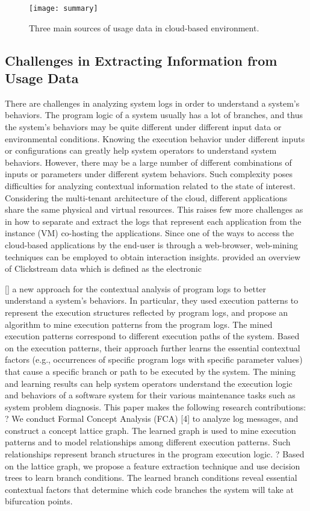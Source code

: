 \begin{figure}[t!]
	\centering
	\texttt{[image: summary]}
	\caption{Three main sources of usage data in cloud-based environment.}
	\label{fig:schema}
\end{figure}

\subsection{Challenges in Extracting Information from Usage Data}

There are challenges in analyzing system logs in order to understand a system’s behaviors. The program logic of a system usually has a lot of branches, and thus the system’s behaviors may be quite different under different input data or environmental conditions. Knowing the execution behavior under different inputs or configurations can greatly help system operators to understand system behaviors. However, there may be a large number of different combinations of inputs or parameters under different system behaviors. Such complexity poses difficulties for analyzing contextual information related to the state of interest. Considering the multi-tenant architecture of the cloud, different applications share the same physical and virtual resources. This raises few more challenges as in how to separate and extract the logs that represent each application from the instance (VM) co-hosting the applications. 
%
Since one of the ways to access the cloud-based applications by the end-user is through a web-browser, web-mining techniques can be employed to obtain interaction insights. \cite{Bucklin2009} provided an overview of Clickstream data which is defined as the electronic 

[] a new approach for the contextual analysis of program logs to better understand a system’s behaviors. In particular, they used execution patterns to represent the execution structures reflected by program logs, and propose an algorithm to mine execution patterns from the program logs. The mined execution patterns correspond to different execution paths of the system. Based on the execution patterns, their approach further learns the essential contextual factors (e.g., occurrences of specific program logs with specific parameter values) that cause a specific branch or path to be executed by the system. 
%
The mining and learning results can help system operators understand the execution logic and behaviors of a software system for their various maintenance tasks such as system problem diagnosis. This paper makes the following research contributions: ? We conduct Formal Concept Analysis (FCA) [4] to analyze log messages, and construct a concept lattice graph. The learned graph is used to mine execution patterns and to model relationships among different execution patterns. Such relationships represent branch structures in the program execution logic.
? Based on the lattice graph, we propose a feature extraction technique and use decision trees to learn branch conditions. The learned branch conditions reveal essential contextual factors that determine which code branches the system will take at bifurcation points.

